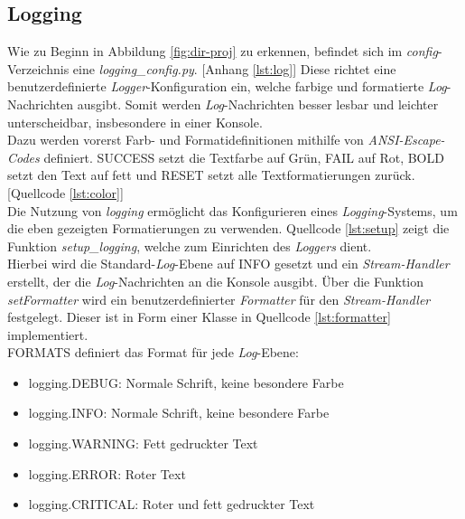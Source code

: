 \subsection{Logging}
Wie zu Beginn in Abbildung \ref{fig:dir-proj} zu erkennen, befindet sich im \textit{config}-Verzeichnis eine \textit{logging\_config.py}. [Anhang \ref{lst:log}] Diese richtet eine benutzerdefinierte \textit{Logger}-Konfiguration ein, welche farbige und formatierte \textit{Log}-Nachrichten ausgibt. Somit werden \textit{Log}-Nachrichten besser lesbar und leichter unterscheidbar, insbesondere in einer Konsole.\\ Dazu werden vorerst Farb- und Formatidefinitionen mithilfe von \textit{ANSI-Escape-Codes} definiert. SUCCESS setzt die Textfarbe auf Grün, FAIL auf Rot, BOLD setzt den Text auf fett und RESET setzt alle Textformatierungen zurück. [Quellcode \ref{lst:color}]\\
\vspace{-.3cm}
Die Nutzung von \textit{logging} ermöglicht das Konfigurieren eines \textit{Logging}-Systems, um die eben gezeigten Formatierungen zu verwenden. Quellcode \ref{lst:setup} zeigt die Funktion \textit{setup\_logging}, welche zum Einrichten des \textit{Loggers} dient. \\
\vspace{-.3cm}Hierbei wird die Standard-\textit{Log}-Ebene auf INFO gesetzt und ein \textit{Stream-Handler} erstellt, der die \textit{Log}-Nachrichten an die Konsole ausgibt.
Über die Funktion \textit{setFormatter} wird ein benutzerdefinierter \textit{Formatter} für den \textit{Stream-Handler} festgelegt. Dieser ist in Form einer Klasse in Quellcode \ref{lst:formatter} implementiert.\\
\vspace{-.3cm}
FORMATS definiert das Format für jede \textit{Log}-Ebene:
\begin{itemize}
    \setlength{\parskip}{1pt}
    \item logging.DEBUG: Normale Schrift, keine besondere Farbe
    \item logging.INFO: Normale Schrift, keine besondere Farbe
    \item logging.WARNING: Fett gedruckter Text
    \item logging.ERROR: Roter Text
    \item logging.CRITICAL: Roter und fett gedruckter Text
\end{itemize}
